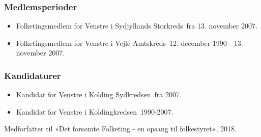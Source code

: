 \documentclass[11pt, a4paper]{awesome-cv}
\begin{document}
\begin{cvletter}
\subsubsection*{Medlemsperioder}
\begin{itemize}
\item Folketingsmedlem for Venstre i Sydjyllands Storkreds fra 13. november 2007.
\item Folketingsmedlem for Venstre i Vejle Amtskreds 12. december 1990 - 13. november 2007.
\end{itemize}
\subsubsection*{Kandidaturer}
\begin{itemize}
\item Kandidat for Venstre i Kolding Sydkredsen fra 2007.
\item Kandidat for Venstre i Koldingkredsen 1990-2007.
\end{itemize}
Medforfatter til »Det forsømte Folketing - en opsang til folkestyret«, 2018.

\end{cvletter}
\end{document}

